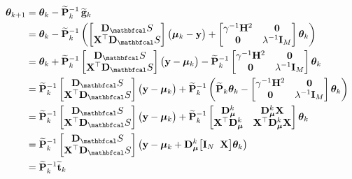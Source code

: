 \begin{align*}
    \thetaa_{k + 1} &= \thetaa_k - \widetilde{\PP}^{-1}_k \, \widetilde{\g}_k \\
    &= \thetaa_k - \widetilde{\PP}^{-1}_k \left( \begin{bmatrix}
        \D_\St \\ \X^\top \D_\St
    \end{bmatrix} \big(\muu_k - \y\big) + \begin{bmatrix}
        \gamma^{-1} \HH^2 & \zero \\
    \zero & \lambda^{-1} \I_M
    \end{bmatrix} \thetaa_k \right)\\
    &= \thetaa_k + \widetilde{\PP}^{-1}_k  \begin{bmatrix}
        \D_\St \\ \X^\top \D_\St
    \end{bmatrix} \big(\y - \muu_k\big) - \widetilde{\PP}^{-1}_k  \begin{bmatrix}
        \gamma^{-1} \HH^2 & \zero \\
    \zero & \lambda^{-1} \I_M
    \end{bmatrix} \thetaa_k \\
    &=  \widetilde{\PP}^{-1}_k  \begin{bmatrix}
        \D_\St \\ \X^\top \D_\St
    \end{bmatrix} \big(\y - \muu_k\big) + \widetilde{\PP}^{-1}_k  \left(\widetilde{\PP}_k \thetaa_k - \begin{bmatrix}
        \gamma^{-1} \HH^2 & \zero \\
    \zero & \lambda^{-1} \I_M
    \end{bmatrix} \thetaa_k \right)\\
    &=  \widetilde{\PP}^{-1}_k  \begin{bmatrix}
        \D_\St \\ \X^\top \D_\St
    \end{bmatrix} \big(\y - \muu_k\big) + \widetilde{\PP}^{-1}_k  \begin{bmatrix}
        \D_{\muu}^k & \D_{\muu}^k \X \\ 
        \X^\top \D_{\muu}^k  & \X^\top \D_{\muu}^k \X
    \end{bmatrix} \thetaa_k \\
    &=  \widetilde{\PP}^{-1}_k  \begin{bmatrix}
        \D_\St \\ \X^\top \D_\St
    \end{bmatrix} \left(\y - \muu_k + \D_{\muu}^k \big[\I_N \;\; \X \big] \thetaa_k \right) \\
    &= \widetilde{\PP}_k^{-1} \widetilde{\tee}_k 
\end{align*}

